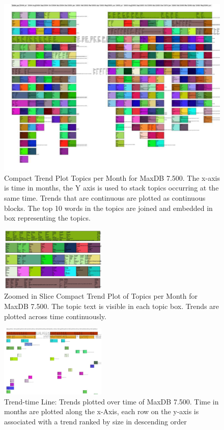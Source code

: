 \documentclass[times, 10pt,twocolumn]{article}
\begin{document}
\begin{figure}
  \centering
  \includegraphics[width=1.0\textwidth]{fixed-time-smear-plot-scaled}
  \caption{Compact Trend Plot Topics per Month for MaxDB 7.500. The
    x-axis is time in months, the Y axis is used to stack topics
    occurring at the same time. Trends that are continuous are
    plotted as continuous blocks. The top 10 words in the topics are
    joined and embedded in box representing the topics.}
  \label{fig:topicsmear}
\end{figure}


\begin{figure}
  \centering
  \includegraphics[width=0.45\textwidth]{fixed-time-smear-plot-cropped}
  \caption{Zoomed in Slice Compact Trend Plot of Topics per Month for MaxDB 7.500. The topic text is visible in each topic box. Trends are plotted across time continuously.}
  \label{fig:zoomedsmear}
\end{figure}


\begin{figure}
  \centering
  \includegraphics[width=0.45\textwidth]{class-smear-plot-crop-scaled}
  \caption{Trend-time Line: Trends plotted over time of MaxDB 7.500. Time in months are plotted along the x-Axis, each row on the y-axis is associated with a trend ranked by size in descending order}         
  \label{fig:trendtimeline}
\end{figure}
\end{document}

